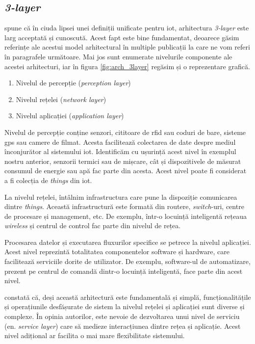 \subsection*{\textit{3-layer}}

\citet{MiaoWu2010} spune că în ciuda lipsei unei definiții unificate pentru \acrshort{iot}, arhitectura \textit{3-layer} este larg acceptată și cunoscută. Acest fapt este bine fundamentat, deoarece găsim referințe ale acestui model arhitectural în multiple publicații la care ne vom referi în paragrafele următoare. Mai jos sunt enumerate nivelurile componente ale acestei arhitecturi, iar în figura \ref{fig:arch_3layer} regăsim și o reprezentare grafică.

\begin{enumerate}
    \item Nivelul de percepție (\textit{perception layer})
    \item Nivelul rețelei (\textit{network layer})
    \item Nivelul aplicației (\textit{application layer})
\end{enumerate}

Nivelul de percepție conține senzori, cititoare de \acrshort{rfid} sau coduri de bare, sisteme \acrfull{gps} sau camere de filmat. Acesta facilitează colectarea de date despre mediul înconjurător al sistemului \acrshort{iot}. Identificăm cu ușurință acest nivel în exemplul nostru anterior, senzorii termici sau de mișcare, cât și dispozitivele de măsurat consumul de energie sau apă fac parte din acesta. Acest nivel poate fi considerat a fi colecția de \textit{things} din \acrshort{iot}.

La nivelul rețelei, întâlnim infrastructura care pune la dispoziție comunicarea dintre \textit{things}. Această infrastructură este formată din routere, \textit{switch}-uri, centre de procesare și management, etc. De exemplu, într-o locuință inteligentă rețeaua \textit{wireless} și centrul de control fac parte din nivelul de rețea.

Procesarea datelor și executarea fluxurilor specifice se petrece la nivelul aplicației. Acest nivel reprezintă totalitatea componentelor software și hardware, care facilitează serviciile dorite de utilizator. De exemplu, software-ul de automatizare, prezent pe centrul de comandă dintr-o locuință inteligentă, face parte din acest nivel.

\citet{Lin2017} constată că, deși această arhitectură este fundamentală și simplă, funcționalitățile și operațiunile desfășurate de sistem la nivelul rețelei și aplicației sunt diverse și complexe. În opinia autorilor, este nevoie de dezvoltarea unui nivel de serviciu (en. \textit{service layer}) care să medieze interacțiunea dintre rețea și aplicație. Acest nivel adițional ar facilita o mai mare flexibilitate sistemului.

